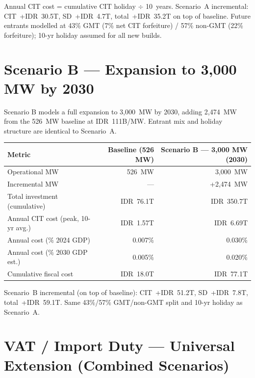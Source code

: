 \documentclass[a4paper,10pt]{article}
\begin{document}
\vspace{4pt}
{\footnotesize\color{midgray}
  Annual CIT cost = cumulative CIT holiday $\div$ 10~years. Scenario~A incremental: CIT~+IDR~30.5T, SD~+IDR~4.7T, total~+IDR~35.2T on top of baseline.
  Future entrants modelled at 43\% GMT (7\% net CIT forfeiture) / 57\% non-GMT (22\% forfeiture); 10-yr holiday assumed for all new builds.
}

\vspace{10pt}

\section{Scenario B --- Expansion to 3,000 MW by 2030}

Scenario B models a full expansion to 3,000~MW by 2030, adding 2,474~MW from the 526~MW baseline at IDR~111B/MW. Entrant mix and holiday structure are identical to Scenario~A.

\small
\begin{tabular}{lrr}
  \toprule
  \textbf{Metric} & \textbf{Baseline (526 MW)} & \textbf{Scenario B --- 3,000 MW (2030)} \\
  \midrule
  Operational MW                      & 526~MW      & 3,000~MW \\
  Incremental MW                      & ---         & +2,474~MW \\
  Total investment (cumulative)       & IDR~76.1T   & IDR~350.7T \\
  Annual CIT cost (peak, 10-yr avg.)  & IDR~1.57T   & IDR~6.69T \\
  Annual cost (\% 2024 GDP)           & 0.007\%     & 0.030\% \\
  Annual cost (\% 2030 GDP est.)      & 0.005\%     & 0.020\% \\
  Cumulative fiscal cost              & IDR~18.0T   & IDR~77.1T \\
  \bottomrule
\end{tabular}

\vspace{4pt}
{\footnotesize\color{midgray}
  Scenario~B incremental (on top of baseline): CIT~+IDR~51.2T, SD~+IDR~7.8T, total~+IDR~59.1T.
  Same 43\%/57\% GMT/non-GMT split and 10-yr holiday as Scenario~A.
}

\vspace{10pt}

\section{VAT / Import Duty --- Universal Extension (Combined Scenarios)}
\end{document}

